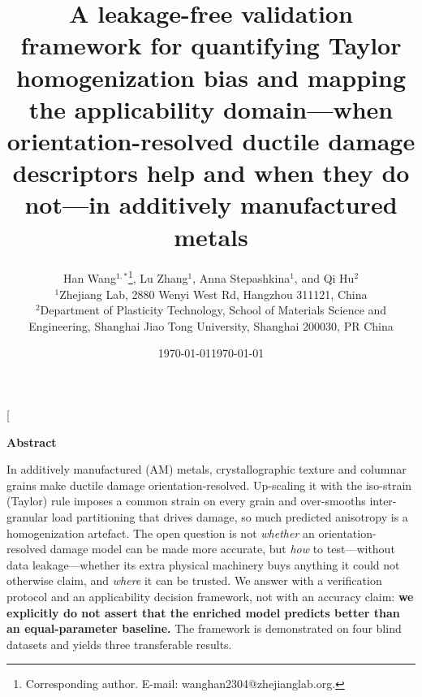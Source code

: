 \documentclass[12pt,a4paper,twocolumn]{article}
\title{\textbf{A leakage-free validation framework for quantifying Taylor homogenization bias and mapping the applicability domain---when orientation-resolved ductile damage descriptors help and when they do not---in additively manufactured metals}}
\author{
  Han Wang$^{1,*}$\thanks{Corresponding author. E-mail: wanghan2304@zhejianglab.org.},
  Lu Zhang$^{1}$,
  Anna Stepashkina$^{1}$, and
  Qi Hu$^{2}$\\
  $^{1}$Zhejiang Lab, 2880 Wenyi West Rd, Hangzhou 311121, China\\
  $^{2}$Department of Plasticity Technology, School of Materials Science and Engineering, Shanghai Jiao Tong University, Shanghai 200030, PR China
}
\date{\today}
\date{\today}
\begin{document}
\twocolumn[
\begin{@twocolumnfalse}
\maketitle
\vspace{-8mm}
\begin{center}
\begin{minipage}{0.92\textwidth}
\small
\noindent\textbf{Abstract}

In additively manufactured (AM) metals, crystallographic texture and columnar grains make ductile damage orientation-resolved. Up-scaling it with the iso-strain (Taylor) rule imposes a common strain on every grain and over-smooths inter-granular load partitioning that drives damage, so much predicted anisotropy is a homogenization artefact. The open question is not \emph{whether} an orientation-resolved damage model can be made more accurate, but \emph{how} to test---without data leakage---whether its extra physical machinery buys anything it could not otherwise claim, and \emph{where} it can be trusted. We answer with a verification protocol and an applicability decision framework, not with an accuracy claim: \textbf{we explicitly do not assert that the enriched model predicts better than an equal-parameter baseline.} The framework is demonstrated on four blind datasets and yields three transferable results.


\end{minipage}
\end{center}
\end{@twocolumnfalse}
\end{document}

